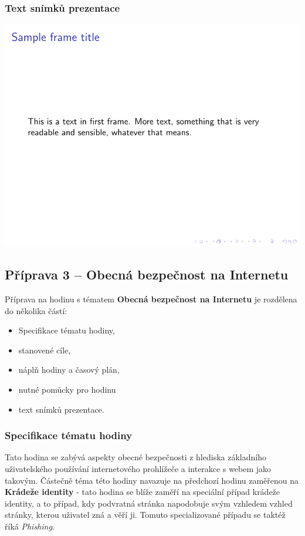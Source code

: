 \documentclass[a4paper, 12pt]{article}
\begin{document}
\subsubsection{Text snímků prezentace}
\includegraphics{IdentityTheftSlides/xdusek21-IdentityTheft.pdf}


\subsection{Příprava 3 -- Obecná bezpečnost na Internetu}
Příprava na hodinu s tématem \textbf{Obecná bezpečnost na Internetu} je rozdělena do několika částí:
\begin{itemize}
        \setlength{\itemsep}{-3pt}
        \item Specifikace tématu hodiny,
        \item stanovené cíle,
        \item náplň hodiny a časový plán,
        \item nutné pomůcky pro hodinu
        \item text snímků prezentace.
\end{itemize}

\subsubsection{Specifikace tématu hodiny}
Tato hodina se zabývá aspekty obecné bezpečnosti z hlediska základního uživatelského používání internetového prohlížeče a interakce s webem jako takovým. Částečně téma této hodiny navazuje na předchozí hodinu zaměřenou na \textbf{Krádeže identity} - tato hodina se blíže zaměří na speciální případ krádeže identity, a to případ, kdy podvratná stránka napodobuje svým vzhledem vzhled stránky, kterou uživatel zná a věří ji. Tomuto specializované případu se taktéž říká \textit{Phishing}.
\end{document}
